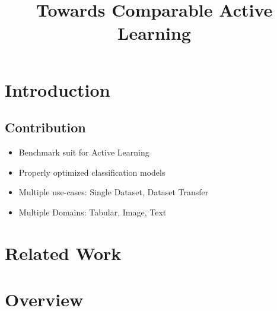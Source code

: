 \documentclass[]{article}
\title{Towards Comparable Active Learning}
\begin{document}
\maketitle

\section{Introduction}


\subsection{Contribution}
\begin{itemize}
	\item Benchmark suit for Active Learning
	\item Properly optimized classification models
	\item Multiple use-cases: Single Dataset, Dataset Transfer
	\item Multiple Domains: Tabular, Image, Text
\end{itemize}

\section{Related Work}

\section{Overview}
\end{document}
